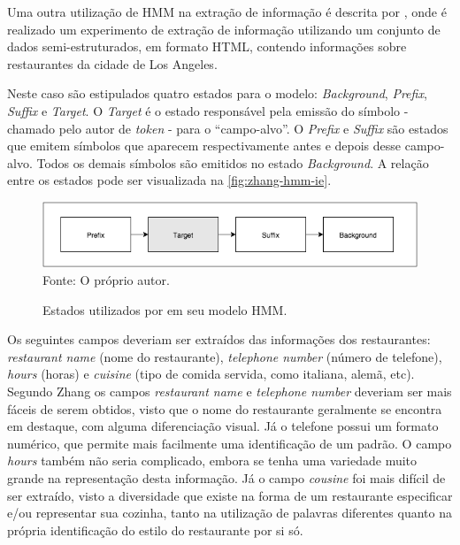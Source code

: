 
Uma outra utilização de HMM na extração de informação é descrita por \cite{Zhang-HMM-IE}, onde é realizado um experimento de extração de informação utilizando um conjunto de dados semi-estruturados, em formato HTML, contendo informações sobre restaurantes da cidade de Los Angeles.

Neste caso são estipulados quatro estados para o modelo: \textit{Background}, \textit{Prefix}, \textit{Suffix} e \textit{Target}. O \textit{Target} é o estado responsável pela emissão do símbolo - chamado pelo autor de \textit{token} - para o ``campo-alvo''. O \textit{Prefix} e \textit{Suffix} são estados que emitem símbolos que aparecem respectivamente antes e depois desse campo-alvo. Todos os demais símbolos são emitidos no estado \textit{Background}. A relação entre os estados pode ser visualizada na \autoref{fig:zhang-hmm-ie}.

\begin{figure}[h!]
    \centering
    \caption{Estados utilizados por \cite{Zhang-HMM-IE} em seu modelo HMM.}
    \label{fig:zhang-hmm-ie}
    \includegraphics[width=0.8\linewidth]{./assets/images/zhang-hmm-ie}
    \center\footnotesize{Fonte: O próprio autor.}
\end{figure}

Os seguintes campos deveriam ser extraídos das informações dos restaurantes: \textit{restaurant name} (nome do restaurante), \textit{telephone number} (número de telefone), \textit{hours} (horas) e \textit{cuisine} (tipo de comida servida, como italiana, alemã, etc). Segundo Zhang \cite{Zhang-HMM-IE} os campos \textit{restaurant name} e \textit{telephone number} deveriam ser mais fáceis de serem obtidos, visto que o nome do restaurante geralmente se encontra em destaque, com alguma diferenciação visual. Já o telefone possui um formato numérico, que permite mais facilmente uma identificação de um padrão. O campo \textit{hours} também não seria complicado, embora se tenha uma variedade muito grande na representação desta informação. Já o campo \textit{cousine} foi mais difícil de ser extraído, visto a diversidade que existe na forma de um restaurante especificar e/ou representar sua cozinha, tanto na utilização de palavras diferentes quanto na própria identificação do estilo do restaurante por si só.


